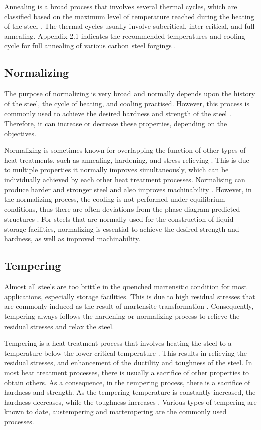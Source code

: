 Annealing is a broad process that involves several thermal cycles, which are classified based on the maximum level of temperature reached during the heating of the steel \cite{singh2020applied}. The thermal cycles usually involve subcritical, inter critical, and full annealing. Appendix 2.1 indicates the recommended temperatures and cooling cycle for full annealing of various carbon steel forgings \cite{singh2020applied}.

\subsection{Normalizing}
The purpose of normalizing is very broad and normally depends upon the history of the steel, the cycle of heating, and cooling practised. However, this process is commonly used to achieve the desired hardness and strength of the steel \cite{singh2020applied}. Therefore, it can increase or decrease these properties, depending on the objectives. 

Normalizing is sometimes known for overlapping the function of other types of heat treatments, such as annealing, hardening, and stress relieving \cite{singh2020applied}. This is due to multiple properties it normally improves simultaneously, which can be individually achieved by each other heat treatment processes. Normalising can produce harder and stronger steel and also improves machinability \cite{mampuya2021effect}. However, in the normalizing process, the cooling is not performed under equilibrium conditions, thus there are often deviations from the phase diagram predicted structures \cite{singh2020applied}.  For steels that are normally used for the construction of liquid storage facilities, normalizing is essential to achieve the desired strength and hardness, as well as improved machinability.

\subsection{Tempering}  
Almost all steels are too brittle in the quenched martensitic condition for most applications, especially storage facilities. This is due to high residual stresses that are commonly induced as the result of martensite transformation \cite{mampuya2021effect}. Consequently, tempering always follows the hardening or normalizing process to relieve the residual stresses and relax the steel. 

Tempering is a heat treatment process that involves heating the steel to a temperature below the lower critical temperature \cite{singh2020applied}. This results in relieving the residual stresses, and enhancement of the ductility and toughness of the steel. In most heat treatment processes, there is usually a sacrifice of other properties to obtain others. As a consequence, in the tempering process, there is a sacrifice of hardness and strength. As the tempering temperature is constantly increased, the hardness decreases, while the toughness increases \cite{singh2020applied}. Various types of tempering are known to date, austempering and martempering are the commonly used processes.

